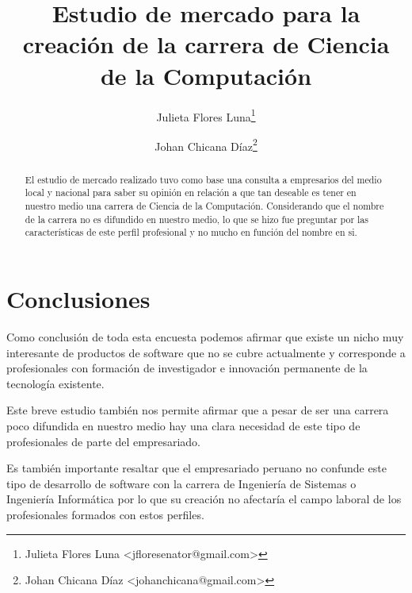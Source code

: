 \documentclass[a4paper,10pt]{article}
\title{Estudio de mercado para la creación de la carrera de Ciencia de la Computación}
\author{Julieta Flores Luna\footnote{Julieta Flores Luna <jfloresenator@gmail.com>}
\and Johan Chicana Díaz\footnote{Johan Chicana Díaz <johanchicana@gmail.com>}}
\begin{document}
\maketitle

\begin{abstract}
El estudio de mercado realizado tuvo como base una consulta a empresarios del medio local y nacional para saber su opinión en relación a que tan deseable es tener en nuestro medio una carrera de Ciencia de la Computación. Considerando que el nombre de la carrera no es difundido en nuestro medio, lo que se hizo fue preguntar por las características de este perfil profesional y no mucho en función del nombre en si.
\end{abstract}





\section{Conclusiones}
Como conclusión de toda esta encuesta podemos afirmar que existe un nicho muy interesante de productos de software que no se cubre actualmente y corresponde a profesionales con formación de investigador e innovación permanente de la tecnología existente.

Este breve estudio también nos permite afirmar que a pesar de ser una carrera poco difundida en nuestro medio hay una clara necesidad de este tipo de profesionales de parte del empresariado.

Es también importante resaltar que el empresariado peruano no confunde este tipo de desarrollo de software con la carrera de Ingeniería de Sistemas o Ingeniería Informática por lo que su creación no afectaría el campo laboral de los profesionales formados con estos perfiles.
\end{document}
